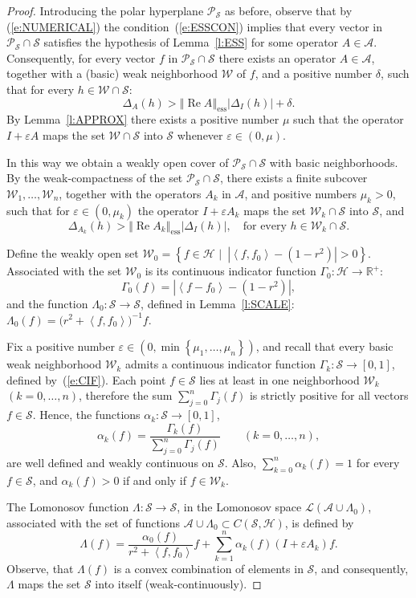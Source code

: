 \documentclass{tran-l}
\theoremstyle{definition}
\theoremstyle{remark}
\numberwithin{equation}{subsection}
\DeclareMathOperator{\RE}{Re}
\DeclareMathOperator{\ess}{ess}
\newcommand{\eps}{\varepsilon}
\newcommand{\To}{\longrightarrow}
\newcommand{\h}{\mathcal{H}}
\newcommand{\s}{\mathcal{S}}
\newcommand{\A}{\mathcal{A}}
\newcommand{\W}{\mathcal{W}}
\newcommand{\Real}{\mathbb{R}}
\newcommand{\RPlus}{\Real^{+}}
\newcommand{\Polar}{\mathcal{P}_{\s}}
\newcommand{\Lom}{\mathcal{L}}
\newcommand{\abs}[1]{\left\vert#1\right\vert}
\newcommand{\set}[1]{\left\{#1\right\}}
\newcommand{\seq}[1]{\left<#1\right>}
\newcommand{\norm}[1]{\left\Vert#1\right\Vert}
\newcommand{\essnorm}[1]{\norm{#1}_{\ess}}
\begin{document}
\begin{proof}
Introducing the polar hyperplane $\Polar$ as before, observe that by (\ref{e:NUMERICAL}) the condition~(\ref{e:ESSCON}) implies that every vector in $\Polar\cap\s$ satisfies the hypothesis of Lemma~\ref{l:ESS} for some operator $A\in\A$. Consequently, for every vector $f$ in $\Polar\cap\s$ there exists an operator $A\in\A$, together with a (basic) weak neighborhood $\W$ of $f$, and a positive number $\delta$, such that for every $h\in\W\cap\s$:
\[ \Delta_A(h) > \essnorm{\RE{A}}\abs{\Delta_I(h)} + \delta. \]
By Lemma~\ref{l:APPROX} there exists a positive number $\mu$ such that the operator $I+\eps A$ maps the set $\W\cap\s$ into $\s$ whenever $\eps\in(0,\mu)$.

In this way we obtain a weakly open cover of $\Polar\cap\s$ with basic neighborhoods. By the weak-compactness of the set $\Polar\cap\s$, there exists a finite subcover $\W_1,\ldots,\W_n$, together with the operators $A_k$ in $\A$, and positive numbers $\mu_k>0$, such that for $\eps\in(0,\mu_k)$ the operator $I+\eps{A_k}$ maps the set $\W_k\cap\s$ into $\s$, and
\begin{equation}\label{e:EINEQ}
  \Delta_{A_k}(h) > \essnorm{\RE{A_k}} \abs{\Delta_I(h)},
  \quad \text{for every $h\in\W_k\cap\s$}.
\end{equation}

Define the weakly open set $\W_0=\set{f\in\h\,\,|\,\,\,\abs{\seq{f,f_0}-(1-r^2)}>0}$. Associated with the set $\W_0$ is its continuous indicator function $\Gamma_0\colon\h\To\RPlus$:
\[ \Gamma_0(f)=\abs{\seq{f-f_0}-(1-r^2)}, \]
and the function $\Lambda_0\colon\s\To\s$, defined in Lemma~\ref{l:SCALE}: $\Lambda_0(f)=\big(r^2+\seq{f,f_0}\big)^{-1}f$.

Fix a positive number $\eps\in(0,\min\set{\mu_1,\ldots,\mu_n})$, and recall that every basic weak neighborhood $\W_k$ admits a continuous indicator function $\Gamma_k\colon\s\To[0,1]$, defined by~(\ref{e:CIF}). Each point $f\in\s$ lies at least in one neighborhood $\W_k$ $(k=0,\ldots,n)$, therefore the sum $\sum_{j=0}^n\Gamma_j(f)$ is strictly positive for all vectors $f\in\s$. Hence, the functions $\alpha_k\colon\s\To[0,1]$,
\[ \alpha_k(f) =
   \frac{\Gamma_k(f)}{\sum_{j=0}^n \Gamma_j(f)} \quad\quad
     (k=0,\ldots,n), \]
are well defined and weakly continuous on $\s$. Also, $\sum_{k=0}^n\alpha_k(f)=1$ for every $f \in \s$, and $\alpha_k(f)>0$ if and only if $f\in\W_k$.

The Lomonosov function $\Lambda\colon\s\To\s$, in the Lomonosov space $\Lom({\A\cup\Lambda_0})$, associated with the set of functions $\A\cup\Lambda_0\subset{C}(\s,\h)$, is defined by
\[ \Lambda(f) = \frac{\alpha_0(f)}{r^2+\seq{f,f_0}}
    f+\sum_{k=1}^n \alpha_k(f) (I+\eps A_k)f. \]
Observe, that $\Lambda(f)$ is a convex combination of elements in $\s$, and consequently, $\Lambda$ maps the set $\s$ into itself (weak-continuously).


\end{proof}
\end{document}
